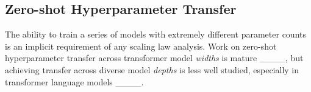 \subsection{Zero-shot Hyperparameter Transfer}\label{sec:mup-relwork}

The ability to train a series of models with extremely different parameter counts is an implicit requirement of any scaling law analysis. Work on zero-shot hyperparameter transfer across transformer model \textit{widths} is mature ____, but achieving transfer across diverse model \textit{depths} is less well studied, especially in transformer language models ____. %